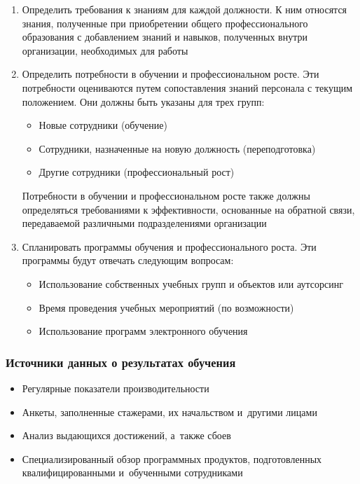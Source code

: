 \documentclass{../industrial-development}
\begin{document}
 	 \begin{enumerate}
\item  Определить требования к знаниям для каждой должности. К ним относятся знания, полученные при приобретении общего профессионального образования с добавлением знаний и навыков, полученных внутри организации, необходимых для работы
\item  Определить потребности в обучении и профессиональном росте. Эти потребности оцениваются путем сопоставления знаний персонала с текущим положением. Они должны быть указаны для трех групп:
 		 \begin{itemize}
	\item Новые сотрудники (обучение)
	\item Сотрудники, назначенные на новую должность (переподготовка)
	\item Другие сотрудники (профессиональный рост)
  		\end{itemize} 
Потребности в обучении и профессиональном росте также должны определяться требованиями к эффективности, основанные на обратной связи, передаваемой различными подразделениями организации
\item  Спланировать программы обучения и профессионального роста. Эти программы будут отвечать следующим вопросам:
	 	 \begin{itemize}
	\item Использование собственных учебных групп и объектов или аутсорсинг
	\item Время проведения учебных мероприятий (по возможности)
	\item Использование программ электронного обучения~\cite[с.~339-341]{SQA-Galin}
  		\end{itemize}
 \end{enumerate}



\begin{frame} \frametitle{Источники данных о результатах обучения}
 	 \begin{itemize}
\item Регулярные показатели производительности
\item Анкеты, заполненные стажерами, их начальством и~другими лицами
\item Анализ выдающихся достижений, а~также сбоев
\item Специализированный обзор программных продуктов, подготовленных квалифицированными и~обученными сотрудниками
  	\end{itemize}
\end{frame}
\end{document}
